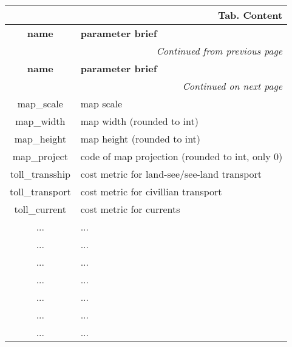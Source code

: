 \documentclass[a4paper,oneside,titlepage]{report}
\newcommand*{\LTHeaderII}[3]{
  \multicolumn{2}{r}{\textbf{Tab. \thesubsection} \textbf{#1}}\\    
  \hline
  \textbf{#2} & \textbf{#3}\\
  \hline

  \endfirsthead
  \multicolumn{2}{r}{\textit{Continued from previous page}}\\    
  \hline
  \textbf{#2} & \textbf{#3}\\
  \hline
  \endhead
  \hline
  \multicolumn{2}{r}{\textit{Continued on next page}}\\
  \endfoot
  \hline
  \endlastfoot  
}
\begin{document}
  \vspace{-0.5cm}
  \begin{longtable}{ |c|l| } 
    \LTHeaderII{Content}{name}{parameter brief}                    
    map\_scale  & map scale\\
    map\_width  & map width (rounded to int)\\
    map\_height  & map height (rounded to int)\\
    map\_project  & code of map projection (rounded to int, only 0)\\
    \hline
    toll\_transship  & cost metric for land-see$/$see-land transport\\
    toll\_transport  & cost metric for civillian transport\\
    toll\_current  & cost metric for currents\\      
    \hline
    ... & ...\\
    ... & ...\\
    ... & ...\\
    ... & ...\\
    ... & ...\\
    ... & ...\\
    ... & ...\\

\end{longtable}
\end{document}
